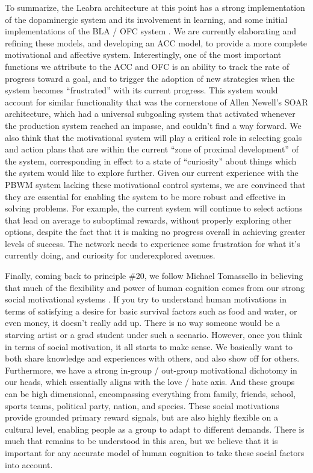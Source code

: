 \documentclass[11pt,twoside]{article}
\begin{document}
To summarize, the Leabra architecture at this point has a strong implementation of the dopaminergic system and its involvement in learning, and some initial implementations of the BLA / OFC system \cite{PauliEtAl}.  We are currently elaborating and refining these models, and developing an ACC model, to provide a more complete motivational and affective system.  Interestingly, one of the most important functions we attribute to the ACC and OFC is an ability to track the rate of progress toward a goal, and to trigger the adoption of new strategies when the system becomes ``frustrated'' with its current progress.  This system would account for similar functionality that was the cornerstone of Allen Newell's SOAR architecture, which had a universal subgoaling system that activated whenever the production system reached an impasse, and couldn't find a way forward.  We also think that the motivational system will play a critical role in selecting goals and action plans that are within the current ``zone of proximal development'' of the system, corresponding in effect to a state of ``curiosity'' about things which the system would like to explore further.  Given our current experience with the PBWM system lacking these motivational control systems, we are convinced that they are essential for enabling the system to be more robust and effective in solving problems.  For example, the current system will continue to select actions that lead on average to suboptimal rewards, without properly exploring other options, despite the fact that it is making no progress overall in achieving greater levels of success.  The network needs to experience some frustration for what it's currently doing, and curiosity for underexplored avenues.

Finally, coming back to principle \#20, we follow Michael Tomassello in believing that much of the flexibility and power of human cognition comes from our strong social motivational systems \cite{Tomassello}.  If you try to understand human motivations in terms of satisfying a desire for basic survival factors such as food and water, or even money, it doesn't really add up.  There is no way someone would be a starving artist or a grad student under such a scenario.  However, once you think in terms of social motivation, it all starts to make sense.  We basically want to both share knowledge and experiences with others, and also show off for others.  Furthermore, we have a strong in-group / out-group motivational dichotomy in our heads, which essentially aligns with the love / hate axis.  And these groups can be high dimensional, encompassing everything from family, friends, school, sports teams, political party, nation, and species.  These social motivations provide grounded primary reward signals, but are also highly flexible on a cultural level, enabling people as a group to adapt to different demands.  There is much that remains to be understood in this area, but we believe that it is important for any accurate model of human cognition to take these social factors into account.
\end{document}
